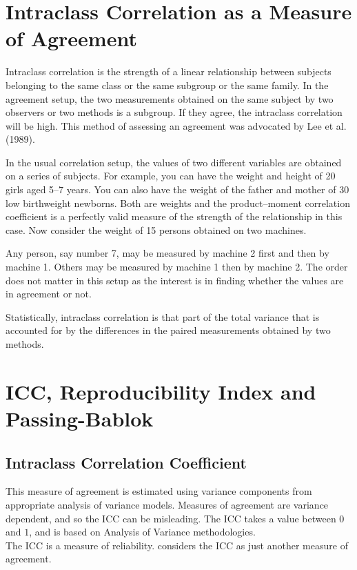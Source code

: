 \section*{Intraclass Correlation as a Measure of Agreement}


Intraclass correlation is the strength of a linear relationship between subjects belonging to the same class or the same subgroup or the same family. In the agreement setup,
the two measurements obtained on the same subject by two observers or two methods is a subgroup. If they agree, the intraclass correlation will be high. This method of
assessing an agreement was advocated by Lee et al. (1989).

In the usual correlation setup, the values of two different variables are obtained on a series of subjects. For example, you can have the weight and height of 20 girls aged 5–7 years. You can also have the weight of the father and mother of 30 low
birthweight newborns. Both are weights and the product–moment correlation coefficient is a perfectly valid measure of the strength of the relationship in this case.
Now consider the weight of 15 persons obtained on two machines. 

Any person, say number 7, may be measured by machine 2 first and then by machine 1. Others may be measured by machine 1 then by machine 2. The order does not matter in this setup as
the interest is in finding whether the values are in agreement or not.

Statistically, intraclass correlation is that part of the total variance that is accounted for by the differences in the paired measurements obtained by two
methods.

	\section{ICC, Reproducibility Index and Passing-Bablok }
	
	
	\subsection{Intraclass Correlation Coefficient} This measure of agreement is estimated using variance components from appropriate analysis of variance models. Measures of agreement are variance dependent, and so the ICC can be misleading. The ICC takes a value between $0$ and $1$, and is based on Analysis of Variance
	methodologies.
	\\
	The ICC is a measure of reliability. \citet{bartko} considers the ICC as just another measure of agreement.
	
